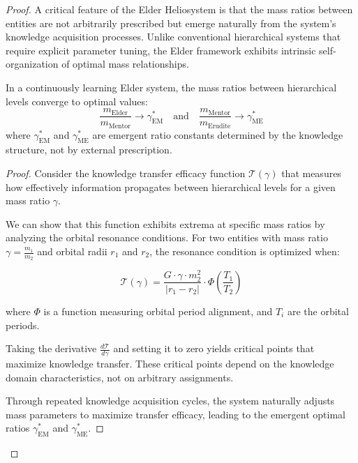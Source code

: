 \begin{proof}
A critical feature of the Elder Heliosystem is that the mass ratios between entities are not arbitrarily prescribed but emerge naturally from the system's knowledge acquisition processes. Unlike conventional hierarchical systems that require explicit parameter tuning, the Elder framework exhibits intrinsic self-organization of optimal mass relationships.

\begin{theorem}
In a continuously learning Elder system, the mass ratios between hierarchical levels converge to optimal values:
\begin{equation}
\frac{m_{\text{Elder}}}{m_{\text{Mentor}}} \to \gamma_{\text{EM}}^* \quad \text{and} \quad \frac{m_{\text{Mentor}}}{m_{\text{Erudite}}} \to \gamma_{\text{ME}}^*
\end{equation}
where $\gamma_{\text{EM}}^*$ and $\gamma_{\text{ME}}^*$ are emergent ratio constants determined by the knowledge structure, not by external prescription.
\end{theorem}

\begin{proof}
Consider the knowledge transfer efficacy function $\mathcal{T}(\gamma)$ that measures how effectively information propagates between hierarchical levels for a given mass ratio $\gamma$. 

We can show that this function exhibits extrema at specific mass ratios by analyzing the orbital resonance conditions. For two entities with mass ratio $\gamma = \frac{m_1}{m_2}$ and orbital radii $r_1$ and $r_2$, the resonance condition is optimized when:

\begin{equation}
\mathcal{T}(\gamma) = \frac{G \cdot \gamma \cdot m_2^2}{|r_1 - r_2|} \cdot \Phi\left(\frac{T_1}{T_2}\right)
\end{equation}

where $\Phi$ is a function measuring orbital period alignment, and $T_i$ are the orbital periods. 

Taking the derivative $\frac{d\mathcal{T}}{d\gamma}$ and setting it to zero yields critical points that maximize knowledge transfer. These critical points depend on the knowledge domain characteristics, not on arbitrary assignments.

Through repeated knowledge acquisition cycles, the system naturally adjusts mass parameters to maximize transfer efficacy, leading to the emergent optimal ratios $\gamma_{\text{EM}}^*$ and $\gamma_{\text{ME}}^*$.
\end{proof}


\end{proof}
